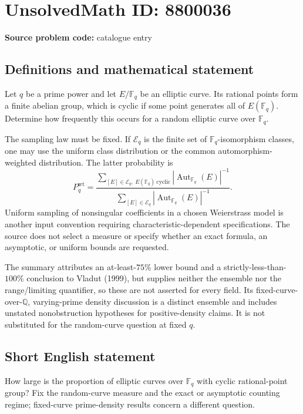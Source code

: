 \documentclass[11pt]{article}
\begin{document}
\section*{UnsolvedMath ID: 8800036}
\textbf{Source problem code:} catalogue entry
\subsection{Definitions and mathematical statement}
Let $q$ be a prime power and let $E/\mathbb F_q$ be an elliptic curve. Its rational points form a finite abelian group, which is cyclic if some point generates all of $E(\mathbb F_q)$. Determine how frequently this occurs for a random elliptic curve over $\mathbb F_q$.

The sampling law must be fixed. If $\mathcal E_q$ is the finite set of $\mathbb F_q$-isomorphism classes, one may use the uniform class distribution or the common automorphism-weighted distribution. The latter probability is
\[
P_q^{\mathrm{wt}}=
\frac{\sum_{[E]\in\mathcal E_q,\ E(\mathbb F_q)\ \mathrm{cyclic}}|\operatorname{Aut}_{\mathbb F_q}(E)|^{-1}}
{\sum_{[E]\in\mathcal E_q}|\operatorname{Aut}_{\mathbb F_q}(E)|^{-1}}.
\]
Uniform sampling of nonsingular coefficients in a chosen Weierstrass model is another input convention requiring characteristic-dependent specifications. The source does not select a measure or specify whether an exact formula, an asymptotic, or uniform bounds are requested.

The summary attributes an at-least-$75\%$ lower bound and a strictly-less-than-$100\%$ conclusion to Vladut (1999), but supplies neither the ensemble nor the range/limiting quantifier, so these are not asserted for every field. Its fixed-curve-over-$\mathbb Q$, varying-prime density discussion is a distinct ensemble and includes unstated nonobstruction hypotheses for positive-density claims. It is not substituted for the random-curve question at fixed $q$.
\subsection{Short English statement}
How large is the proportion of elliptic curves over $\mathbb F_q$ with cyclic rational-point group? Fix the random-curve measure and the exact or asymptotic counting regime; fixed-curve prime-density results concern a different question.
\end{document}
